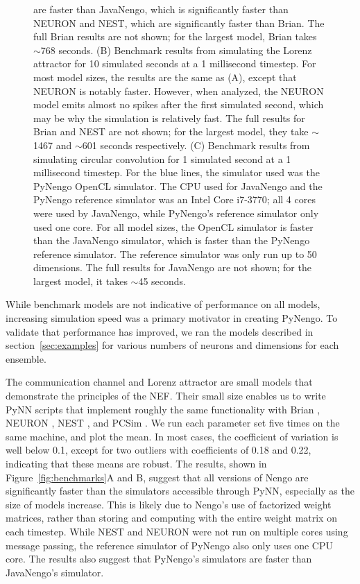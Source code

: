 \documentclass{frontiersSCNS}
\begin{document}
\begin{figure}
{     are faster than JavaNengo,
     which is significantly faster than NEURON and NEST,
     which are significantly faster than Brian.
     The full Brian results are not shown;
     for the largest model, Brian takes $\sim$768 seconds.
     (B) Benchmark results from simulating
     the Lorenz attractor for 10 simulated seconds
     at a 1 millisecond timestep.
     For most model sizes,
     the results are the same as (A),
     except that NEURON is notably faster.
     However, when analyzed, the NEURON model
     emits almost no spikes after the first
     simulated second, which may be
     why the simulation is relatively fast.
     The full results for Brian and NEST are not shown;
     for the largest model, they take $\sim$1467
     and $\sim$601 seconds respectively.
     (C) Benchmark results from simulating
     circular convolution for 1 simulated second
     at a 1 millisecond timestep.
     For the blue lines, the simulator used
     was the PyNengo OpenCL simulator.
     The CPU used for JavaNengo and
     the PyNengo reference simulator
     was an Intel Core i7-3770;
     all 4 cores were used by JavaNengo,
     while PyNengo's reference simulator
     only used one core.
     For all model sizes,
     the OpenCL simulator is faster
     than the JavaNengo simulator,
     which is faster than the PyNengo
     reference simulator.
     The reference simulator was only run
     up to 50 dimensions.
     The full results for JavaNengo
     are not shown; for the largest model,
     it takes $\sim$45 seconds.
     }
\end{figure}

While benchmark models are not indicative
of performance on all models,
increasing simulation speed
was a primary motivator in creating PyNengo.
To validate that performance has improved,
we ran the models described in section~\ref{sec:examples}
for various numbers of neurons and dimensions
for each ensemble.

The communication channel and Lorenz attractor
are small models that demonstrate
the principles of the NEF.
Their small size enables us to write
PyNN scripts that implement roughly
the same functionality
with Brian \citep{goodman2009}, NEURON \citep{hines2009},
NEST \citep{eppler2008}, and PCSim \citep{pecevski2009}.
We run each parameter set five times
on the same machine,
and plot the mean.
In most cases, the coefficient of variation
is well below 0.1, except for two
outliers with coefficients of 0.18 and 0.22,
indicating that these means are robust.
The results, shown in Figure~\ref{fig:benchmarks}A and B,
suggest that all versions of Nengo are significantly
faster than the simulators accessible
through PyNN, especially
as the size of models increase.
This is likely due to Nengo's
use of factorized weight matrices,
rather than storing and computing with
the entire weight matrix
on each timestep.
While NEST and NEURON were not
run on multiple cores using message passing,
the reference simulator of PyNengo
also only uses one CPU core.
The results also suggest that PyNengo's
simulators are faster than JavaNengo's simulator.
\end{document}
